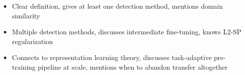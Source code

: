 \begin{interviewq}
\goodgreat
\begin{itemize}
    \item {} Clear definition, gives at least one detection method, mentions domain similarity
    \item {} Multiple detection methods, discusses intermediate fine-tuning, knows L2-SP regularization
    \item {} Connects to representation learning theory, discusses task-adaptive pre-training pipeline at scale, mentions when to abandon transfer altogether
\end{itemize}

\end{interviewq}

